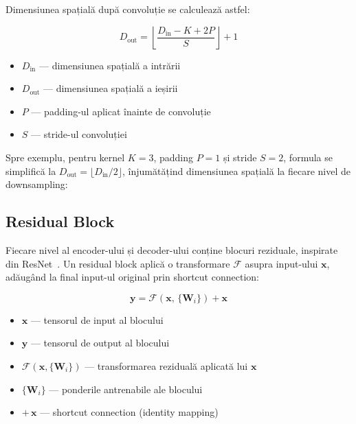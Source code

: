 \documentclass[12pt, a4paper]{report}
\begin{document}
Dimensiunea spațială după convoluție se calculează astfel:

\begin{equation}
    D_{\text{out}}
    = \left\lfloor \frac{D_{\text{in}} - K + 2P}{S}
      \right\rfloor + 1
\end{equation}

\begin{itemize}
    \item $D_{\text{in}}$ — dimensiunea spațială a intrării
    \item $D_{\text{out}}$ — dimensiunea spațială a ieșirii
    \item $P$ — padding-ul aplicat înainte de convoluție
    \item $S$ — stride-ul convoluției
\end{itemize}


Spre exemplu, pentru kernel $K=3$, padding $P=1$ și stride $S=2$,
formula se simplifică la
$D_{\text{out}} = \lfloor D_{\text{in}} / 2 \rfloor$,
înjumătățind dimensiunea spațială la fiecare nivel de downsampling:

    

\subsection{Residual Block}

Fiecare nivel al encoder-ului și decoder-ului conține blocuri
reziduale, inspirate din ResNet~\cite{he2016resnet}. Un residual
block aplică o transformare $\mathcal{F}$ asupra input-ului
$\mathbf{x}$, adăugând la final input-ul original prin
shortcut connection:

\begin{equation}
    \mathbf{y} = \mathcal{F}(\mathbf{x},\,\{\mathbf{W}_i\})
               + \mathbf{x}
\end{equation}

\begin{itemize}
    \item $\mathbf{x}$ — tensorul de input al blocului
    \item $\mathbf{y}$ — tensorul de output al blocului
    \item $\mathcal{F}(\mathbf{x},\{\mathbf{W}_i\})$ — transformarea reziduală aplicată lui $\mathbf{x}$
    \item $\{\mathbf{W}_i\}$ — ponderile antrenabile ale blocului
    \item $+\,\mathbf{x}$ — shortcut connection (identity mapping)
\end{itemize}
\end{document}

